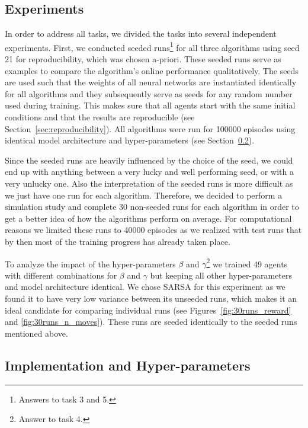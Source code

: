 \documentclass[conference]{IEEEtran}
\begin{document}
\subsection{Experiments}

In order to address all tasks, we divided the tasks into several independent experiments. First, we conducted seeded runs\footnote{Answers to task 3 and 5.} for all three algorithms using seed 21 for reproducibility, which was chosen a-priori. These seeded runs serve as examples to compare the algorithm's online performance qualitatively. The seeds are used such that the weights of all neural networks are instantiated identically for all algorithms and they subsequently serve as seeds for any random number used during training. This makes sure that all agents start with the same initial conditions and that the results are reproducible (see Section~\ref{sec:reproducibility}). All algorithms were run for 100000 episodes using identical model architecture and hyper-parameters (see Section~\ref{sec:implementation_hyper-parameters}).

Since the seeded runs are heavily influenced by the choice of the seed, we could end up with anything between a very lucky and well performing seed, or with a very unlucky one. Also the interpretation of the seeded runs is more difficult as we just have one run for each algorithm. Therefore, we decided to perform a simulation study and complete 30 non-seeded runs for each algorithm in order to get a better idea of how the algorithms perform on average. For computational reasons we limited these runs to 40000 episodes as we realized with test runs that by then most of the training progress has already taken place.

To analyze the impact of the hyper-parameters $\beta$ and $\gamma$\footnote{Answer to task 4.} we trained 49 agents with different combinations for $\beta$ and $\gamma$ but keeping all other hyper-parameters and model architecture identical. We chose SARSA for this experiment as we found it to have very low variance between its unseeded runs, which makes it an ideal candidate for comparing individual runs (see Figures~\ref{fig:30runs_reward} and \ref{fig:30runs_n_moves}). These runs are seeded identically to the seeded runs mentioned above.




\subsection{Implementation and Hyper-parameters}\label{sec:implementation_hyper-parameters}
\end{document}
